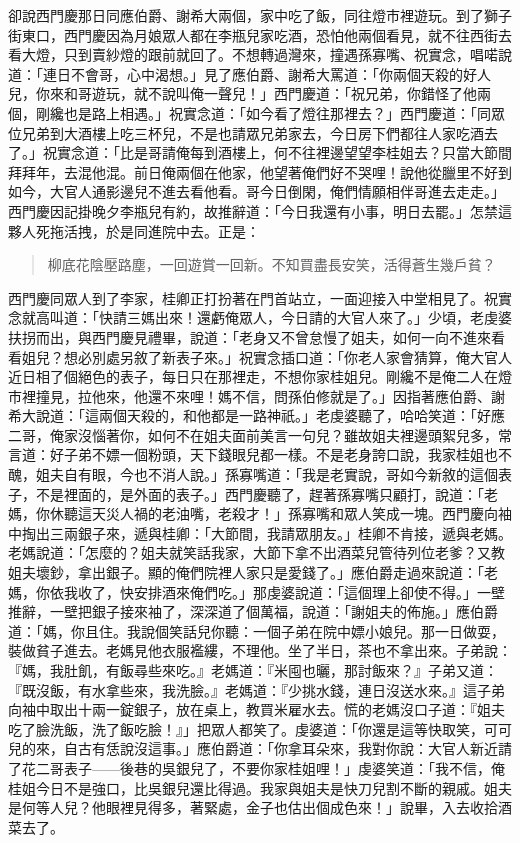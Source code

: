 卻說西門慶那日同應伯爵、謝希大兩個，家中吃了飯，同往燈市裡遊玩。到了獅子街東口，西門慶因為月娘眾人都在李瓶兒家吃酒，恐怕他兩個看見，就不往西街去看大燈，只到賣紗燈的跟前就回了。不想轉過灣來，撞遇孫寡嘴、祝實念，唱喏說道：「連日不會哥，心中渴想。」見了應伯爵、謝希大罵道：「你兩個天殺的好人兒，你來和哥遊玩，就不說叫俺一聲兒！」西門慶道：「祝兄弟，你錯怪了他兩個，剛纔也是路上相遇。」祝實念道：「如今看了燈往那裡去？」西門慶道：「同眾位兄弟到大酒樓上吃三杯兒，不是也請眾兄弟家去，今日房下們都往人家吃酒去了。」祝實念道：「比是哥請俺每到酒樓上，何不往裡邊望望李桂姐去？只當大節間拜拜年，去混他混。前日俺兩個在他家，他望著俺們好不哭哩！說他從臘里不好到如今，大官人通影邊兒不進去看他看。哥今日倒閑，俺們情願相伴哥進去走走。」西門慶因記掛晚夕李瓶兒有約，故推辭道：「今日我還有小事，明日去罷。」怎禁這夥人死拖活拽，於是同進院中去。正是：
\begin{quote}
柳底花陰壓路塵，一回遊賞一回新。不知買盡長安笑，活得蒼生幾戶貧？
\end{quote}

西門慶同眾人到了李家，桂卿正打扮著在門首站立，一面迎接入中堂相見了。祝實念就高叫道：「快請三媽出來！還虧俺眾人，今日請的大官人來了。」少頃，老虔婆扶拐而出，與西門慶見禮畢，說道：「老身又不曾怠慢了姐夫，如何一向不進來看看姐兒？想必別處另敘了新表子來。」祝實念插口道：「你老人家會猜算，俺大官人近日相了個絕色的表子，每日只在那裡走，不想你家桂姐兒。剛纔不是俺二人在燈市裡撞見，拉他來，他還不來哩！媽不信，問孫伯修就是了。」因指著應伯爵、謝希大說道：「這兩個天殺的，和他都是一路神祇。」老虔婆聽了，哈哈笑道：「好應二哥，俺家沒惱著你，如何不在姐夫面前美言一句兒？雖故姐夫裡邊頭絮兒多，常言道：好子弟不嫖一個粉頭，天下錢眼兒都一樣。不是老身誇口說，我家桂姐也不醜，姐夫自有眼，今也不消人說。」孫寡嘴道：「我是老實說，哥如今新敘的這個表子，不是裡面的，是外面的表子。」西門慶聽了，趕著孫寡嘴只顧打，說道：「老媽，你休聽這天災人禍的老油嘴，老殺才！」孫寡嘴和眾人笑成一塊。西門慶向袖中掏出三兩銀子來，遞與桂卿：「大節間，我請眾朋友。」桂卿不肯接，遞與老媽。老媽說道：「怎麼的？姐夫就笑話我家，大節下拿不出酒菜兒管待列位老爹？又教姐夫壞鈔，拿出銀子。顯的俺們院裡人家只是愛錢了。」應伯爵走過來說道：「老媽，你依我收了，快安排酒來俺們吃。」那虔婆說道：「這個理上卻使不得。」一壁推辭，一壁把銀子接來袖了，深深道了個萬福，說道：「謝姐夫的佈施。」應伯爵道：「媽，你且住。我說個笑話兒你聽：一個子弟在院中嫖小娘兒。那一日做耍，裝做貧子進去。老媽見他衣服襤縷，不理他。坐了半日，茶也不拿出來。子弟說：『媽，我肚飢，有飯尋些來吃。』老媽道：『米囤也曬，那討飯來？』子弟又道：『既沒飯，有水拿些來，我洗臉。』老媽道：『少挑水錢，連日沒送水來。』這子弟向袖中取出十兩一錠銀子，放在桌上，教買米雇水去。慌的老媽沒口子道：『姐夫吃了臉洗飯，洗了飯吃臉！』」把眾人都笑了。虔婆道：「你還是這等快取笑，可可兒的來，自古有恁說沒這事。」應伯爵道：「你拿耳朵來，我對你說：大官人新近請了花二哥表子——後巷的吳銀兒了，不要你家桂姐哩！」虔婆笑道：「我不信，俺桂姐今日不是強口，比吳銀兒還比得過。我家與姐夫是快刀兒割不斷的親戚。姐夫是何等人兒？他眼裡見得多，著緊處，金子也估出個成色來！」說畢，入去收拾酒菜去了。

